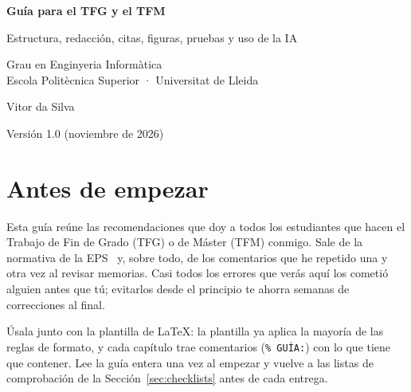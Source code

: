 \documentclass[11pt,a4paper]{article}
\newcommand{\guiaversion}{1.0 (noviembre de 2026)}
\begin{document}
\begin{titlepage}
  \centering
  \vspace*{3cm}
  {\Huge\bfseries Guía para el TFG y el TFM\par}
  \vspace{0.8cm}
  {\Large Estructura, redacción, citas, figuras, pruebas y uso de la IA\par}
  \vspace{2.5cm}
  {\large Grau en Enginyeria Informàtica\\ Escola Politècnica Superior · Universitat de Lleida\par}
  \vspace{2.5cm}
  {\large Vitor da Silva\par}
  \vfill
  {\small Versión \guiaversion\par}
\end{titlepage}

\tableofcontents
\clearpage

\section*{Antes de empezar}

Esta guía reúne las recomendaciones que doy a todos los estudiantes que hacen el
Trabajo de Fin de Grado (TFG) o de Máster (TFM) conmigo. Sale de la normativa de
la EPS~\cite{eps_reglament2024,eps_portafoli2025,eps_terminis2025} y, sobre todo,
de los comentarios que he repetido una y otra vez al revisar memorias. Casi
todos los errores que verás aquí los cometió alguien antes que tú; evitarlos
desde el principio te ahorra semanas de correcciones al final.

Úsala junto con la plantilla de LaTeX: la plantilla ya aplica la mayoría de las
reglas de formato, y cada capítulo trae comentarios (\texttt{\% GUÍA:}) con lo
que tiene que contener. Lee la guía entera una vez al empezar y vuelve a las
listas de comprobación de la Sección~\ref{sec:checklists} antes de cada entrega.
\end{document}
